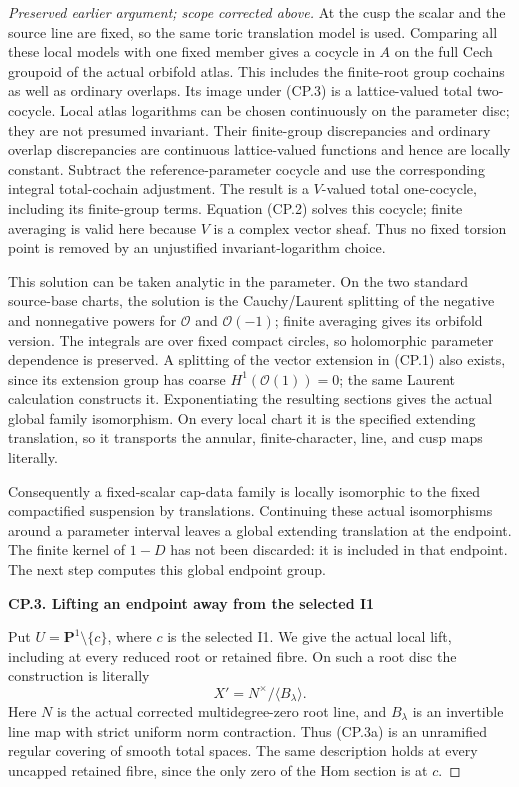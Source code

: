 \begin{proof}[Preserved earlier argument; scope corrected above]
At the cusp the scalar and the source line are fixed, so the same
toric translation model is used. Comparing all these local models
with one fixed member gives a cocycle in \(A\) on the full Cech
groupoid of the actual orbifold atlas. This includes the finite-root
group cochains as well as ordinary overlaps. Its image under (CP.3)
is a lattice-valued total two-cocycle. Local atlas logarithms can be
chosen continuously on the parameter disc; they are not presumed
invariant. Their finite-group discrepancies and ordinary overlap
discrepancies are continuous lattice-valued functions and hence are
locally constant. Subtract the reference-parameter cocycle and use
the corresponding integral total-cochain adjustment. The result is
a \(V\)-valued total one-cocycle, including its finite-group terms.
Equation (CP.2) solves this cocycle; finite averaging is valid here
because \(V\) is a complex vector sheaf. Thus no fixed torsion point is
removed by an unjustified invariant-logarithm choice.

This solution can be taken analytic in the parameter. On the two
standard source-base charts, the solution is the Cauchy/Laurent
splitting of the negative and nonnegative powers for \(\mathcal O\) and \(\mathcal O(-1)\);
finite averaging gives its orbifold version. The integrals are over
fixed compact circles, so holomorphic parameter dependence is
preserved. A splitting of the vector extension in (CP.1) also exists,
since its extension group has coarse \(H^1(\mathcal O(1))=0\); the same Laurent
calculation constructs it. Exponentiating the resulting sections
gives the actual global family isomorphism. On every local chart it
is the specified extending translation, so it transports the
annular, finite-character, line, and cusp maps literally.

Consequently a fixed-scalar cap-data family is locally isomorphic to
the fixed compactified suspension by translations. Continuing these
actual isomorphisms around a parameter interval leaves a global
extending translation at the endpoint. The finite kernel of \(1-D\)
has not been discarded: it is included in that endpoint. The next
step computes this global endpoint group.

\par

\medskip\noindent\textbf{CP.3. Lifting an endpoint away from the selected I1}

\par\nobreak

Put \(U=\mathbf P^1\setminus\{c\}\), where \(c\) is the selected
I1. We give the actual local lift, including at every reduced root or
retained fibre. On such a root disc the construction is literally
\[
              X'=N^\times/\langle B_\lambda\rangle .
                                                               \tag{CP.3a}
\]
Here \(N\) is the actual corrected multidegree-zero root line, and
\(B_\lambda\) is an invertible line map with strict uniform norm
contraction. Thus (CP.3a) is an unramified regular covering of smooth
total spaces. The same description holds at every uncapped retained
fibre, since the only zero of the Hom section is at \(c\).


\end{proof}
